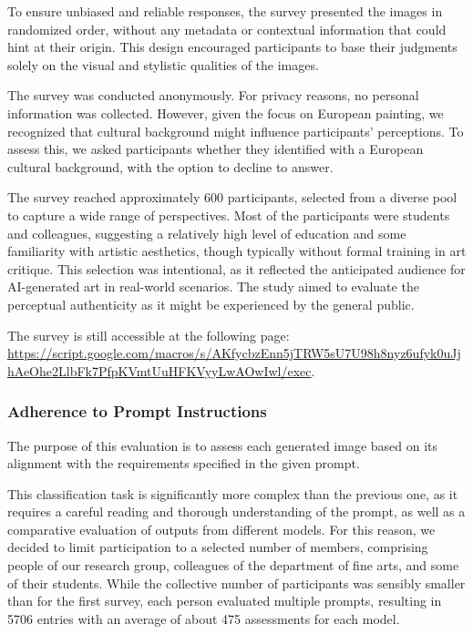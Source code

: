 \documentclass[sn-mathphys]{sn-jnl}
\begin{document}
To ensure unbiased and reliable responses, the survey presented the images in randomized order, without any metadata or contextual information that could hint at their origin. This design encouraged participants to base their judgments solely on the visual and stylistic qualities of the images.

The survey was conducted anonymously. For privacy reasons, no personal information was collected. However, given the focus on European painting, we recognized that cultural background might influence participants' perceptions. To assess this, we asked participants whether they identified with a European cultural background, with the option to decline to answer.

The survey reached approximately 600 participants, selected from a diverse pool to capture a wide range of perspectives. Most of the  participants were students and colleagues, suggesting a relatively high level of education and some familiarity with artistic aesthetics, though typically without formal training in art critique. This selection was intentional, as it reflected the anticipated audience for AI-generated art in real-world scenarios. The study aimed to evaluate the perceptual authenticity as it might be experienced by the general public.

The survey is still accessible at the following page: \href{AI-pastiche_Survey}{https://script.google.com/macros/s/AKfycbzEnn5jTRW5sU7U98h8nyz6ufyk0uJjhAeOhe2LlbFk7PfpKVmtUuHFKVyyLwAOwIwl/exec}.

 \subsubsection{Adherence to Prompt Instructions}
The purpose of this evaluation is to assess each generated image based on its alignment with the requirements specified in the given prompt.

This classification task is significantly more complex than the previous one, as it requires a careful reading and thorough understanding of the prompt, as well as a comparative evaluation of outputs from different models. 
For this reason, we decided to limit participation to a selected number
of members, comprising people of our research group, colleagues of
the department of fine arts, and some of their students. While the
collective number of participants was sensibly smaller than for the first survey, each person
evaluated multiple prompts, resulting in 5706 entries with an average of about 475 assessments for each model.
\end{document}
